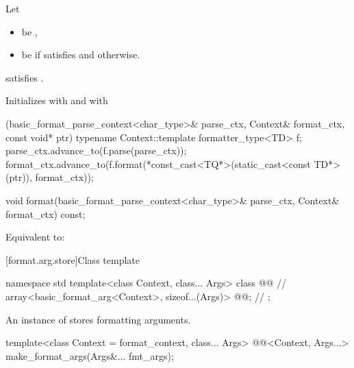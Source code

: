 \begin{itemdescr}
\pnum
Let
\begin{itemize}
\item
{} be ,
\item
{} be  if
 satisfies 
and  otherwise.
\end{itemize}

\pnum
\mandates
{} satisfies .

\pnum
\effects
Initializes
 with  and
 with
\begin{codeblock}
[](basic_format_parse_context<char_type>& parse_ctx,
   Context& format_ctx, const void* ptr) {
  typename Context::template formatter_type<TD> f;
  parse_ctx.advance_to(f.parse(parse_ctx));
  format_ctx.advance_to(f.format(*const_cast<TQ*>(static_cast<const TD*>(ptr)),
                                 format_ctx));
}
\end{codeblock}
\end{itemdescr}

%
\begin{itemdecl}
void format(basic_format_parse_context<char_type>& parse_ctx, Context& format_ctx) const;
\end{itemdecl}

\begin{itemdescr}
\pnum
\effects
Equivalent to: 
\end{itemdescr}

[format.arg.store]{Class template }

\begin{codeblock}
namespace std {
  template<class Context, class... Args>
  class @@ {                                      // \expos
    array<basic_format_arg<Context>, sizeof...(Args)> @@;     // \expos
  };
}
\end{codeblock}

\pnum
An instance of  stores formatting arguments.

%
\begin{itemdecl}
template<class Context = format_context, class... Args>
  @@<Context, Args...> make_format_args(Args&... fmt_args);
\end{itemdecl}

